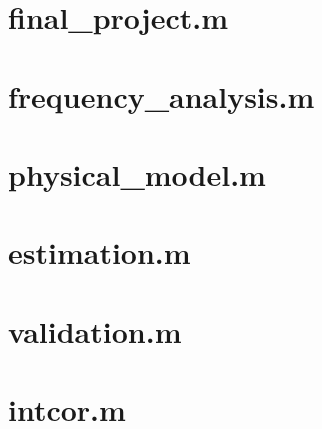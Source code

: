 \documentclass[a4paper,11pt]{article}
\begin{document}
\begin{appendices}
\section{final\_project.m}
\label{app:final_project}


\section{frequency\_analysis.m}
\label{app:frequency_analysis}


\section{physical\_model.m}
\label{app:physical_model}


\section{estimation.m}
\label{app:estimation}


\section{validation.m}
\label{app:validation}


\section{intcor.m}
\label{app:intcor}


\end{appendices}
\end{document}
